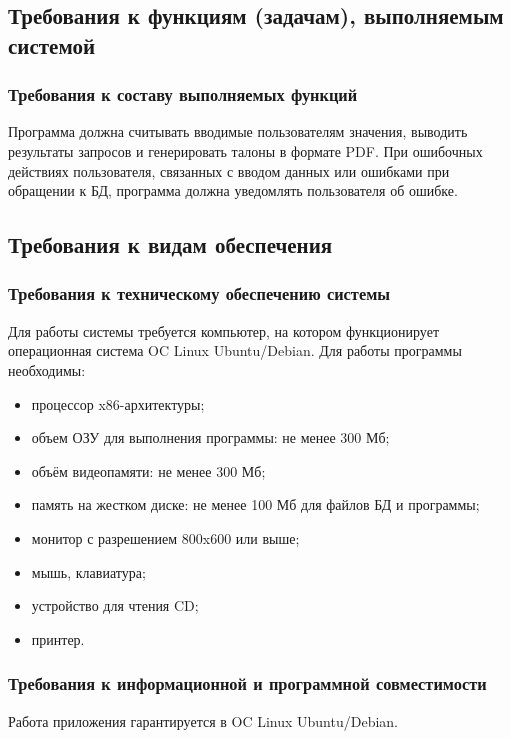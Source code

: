 \subsection{Требования к функциям (задачам), выполняемым системой}
\subsubsection{Требования к составу выполняемых функций}

Программа должна считывать вводимые пользователям значения, выводить результаты запросов и генерировать талоны в формате PDF. При ошибочных действиях пользователя, связанных с вводом данных или ошибками при обращении к БД, программа должна уведомлять пользователя об ошибке.

\subsection{Требования к видам обеспечения}
\subsubsection{Требования к техническому обеспечению системы}

Для работы системы требуется компьютер, на котором функционирует операционная система OC Linux Ubuntu/Debian. Для работы программы необходимы:

\begin{itemize}
  \item процессор x86-архитектуры;
  \item объем ОЗУ для выполнения программы: не менее 300 Мб;
  \item объём видеопамяти: не менее 300 Мб;
  \item память на жестком диске: не менее 100 Мб для файлов БД и программы;
  \item монитор с разрешением 800x600 или выше;
  \item мышь, клавиатура;
  \item устройство для чтения CD;
  \item принтер.
\end{itemize}

\subsubsection{Требования к информационной и программной совместимости}

Работа приложения гарантируется в OC Linux Ubuntu/Debian.

